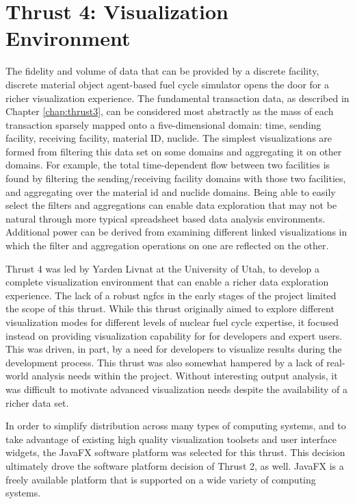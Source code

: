 \chapter{Thrust 4: Visualization Environment}\label{chap:thrust4}

The fidelity and volume of data that can be provided by a discrete facility,
discrete material object agent-based fuel cycle simulator opens the door for a
richer visualization experience.  The fundamental transaction data, as
described in Chapter \ref{chap:thrust3}, can be considered most abstractly as
the mass of each transaction sparsely mapped onto a five-dimensional domain:
time, sending facility, receiving facility, material ID, nuclide.  The
simplest visualizations are formed from filtering this data set on some
domains and aggregating it on other domains.  For example, the total
time-dependent flow between two facilities is found by filtering the
sending/receiving facility domains with those two facilities, and aggregating
over the material id and nuclide domains.  Being able to easily select the
filters and aggregations can enable data exploration that may not be natural
through more typical spreadsheet based data analysis environments.  Additional
power can be derived from examining different linked visualizations in which
the filter and aggregation operations on one are reflected on the other.

Thrust 4 was led by Yarden Livnat at the University of Utah, to develop a
complete visualization environment that can enable a richer data exploration
experience.  The lack of a robust \gls{ngfcs} in the early stages of the
project limited the scope of this thrust.  While this thrust originally aimed
to explore different visualization modes for different levels of nuclear fuel
cycle expertise, it focused instead on providing visualization capability for
\Cyclus for developers and expert users.  This was driven, in part, by a need
for \Cyclus developers to visualize results during the development process.
This thrust was also somewhat hampered by a lack of real-world analysis needs
within the project.  Without interesting output analysis, it was difficult to
motivate advanced visualization needs despite the availability of a richer
data set.

In order to simplify distribution across many types of computing systems, and
to take advantage of existing high quality visualization toolsets and user
interface widgets, the JavaFX software platform was selected for this thrust.
This decision ultimately drove the software platform decision of Thrust 2, as
well.  JavaFX is a freely available platform that is supported on a wide
variety of computing systems.

